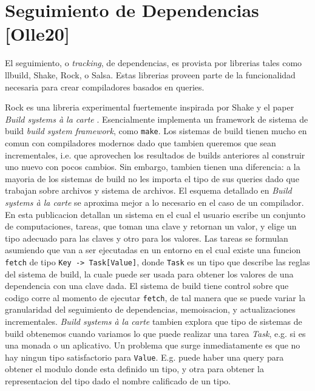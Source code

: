 \documentclass[12pt, a4paper]{report}
\begin{document}
  \section*{Seguimiento de Dependencias [Olle20]}

    El seguimiento, o \textit{tracking}, de dependencias, es provista por librerias tales como llbuild, Shake, Rock, o Salsa.
    Estas librerias proveen parte de la funcionalidad necesaria para crear compiladores basados en queries.

    Rock es una libreria experimental fuertemente inspirada por Shake y el paper \textit{Build systems à la carte} \cite{mokhov2018build}.
    Esencialmente implementa un framework de sistema de build \textit{build system framework}, como \texttt{make}.
    Los sistemas de build tienen mucho en comun con compiladores modernos dado que tambien queremos que sean incrementales, i.e. que aprovechen los resultados de builds anteriores al construir uno nuevo con pocos cambios.
    Sin embargo, tambien tienen una diferencia: a la mayoria de los sistemas de build no les importa el tipo de sus queries dado que trabajan sobre archivos y sistema de archivos.
    El esquema detallado en \textit{Build systems à la carte} se aproxima mejor a lo necesario en el caso de un compilador.
    En esta publicacion detallan un sistema en el cual el usuario escribe un conjunto de computaciones, tareas, que toman una clave y retornan un valor, y elige un tipo adecuado para las claves y otro para los valores.
    Las tareas se formulan asumiendo que van a ser ejecutadas en un entorno en el cual existe una funcion \texttt{fetch} de tipo \texttt{Key -> Task[Value]}, donde \texttt{Task} es un tipo que describe las reglas del sistema de build, la cuale puede ser usada para obtener los valores de una dependencia con una clave dada.
    El sistema de build tiene control sobre que codigo corre al momento de ejecutar \texttt{fetch}, de tal manera que se puede variar la granularidad del seguimiento de dependencias, memoisacion, y actualizaciones incrementales.
    \textit{Build systems à la carte} tambien explora que tipo de sistemas de build obtenemos cuando variamos lo que puede realizar una tarea \textit{Task}, e.g. si es una monada o un aplicativo.
    Un problema que surge inmediatamente es que no hay ningun tipo satisfactorio para \texttt{Value}.
    E.g. puede haber una query para obtener el modulo donde esta definido un tipo, y otra para obtener la representacion del tipo dado el nombre calificado de un tipo.
    \cite{olle_query_based}
\end{document}
